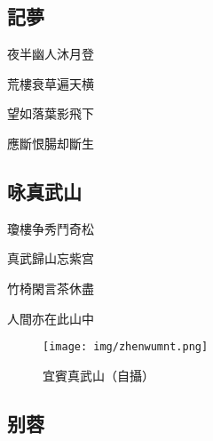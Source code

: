 \documentclass[a4j,12pt]{ltjtarticle}
\begin{document}
\begin{center}
	
	
	
	\newpage
	
	\begin{flushleft}
		\section{記夢} 
	\end{flushleft}	
	
	\vfill
		\LARGE 夜半幽人沐月登 \par
		荒樓衰草遍天横 \par
		望如落葉影飛下 \par
		應斷恨腸却斷生 
		\vspace{2cm} %
	\vfill
	
	\newpage
	
	\begin{flushleft}
		\section{咏真武山} 
	\end{flushleft}	
	
	
	\vfill
		\LARGE 瓊樓争秀鬥奇松 \par
		真武歸山忘紫宫 \par
		竹椅閑言茶休盡 \par
		人間亦在此山中 
		\vspace{1cm} %
	\vfill
	
	
	\newpage
	\vspace{3cm}
	\vfill
	\begin{figure}[h!]
		\centering
		\texttt{[image: img/zhenwumnt.png]}
		\caption{宜賓真武山（自攝）}
		\label{fig:zhenwu}
	\end{figure}
	\vfill
	\newpage
	
	\begin{flushleft}
		\section{别蓉} 
	\end{flushleft}	
	

\end{center}
\end{document}
